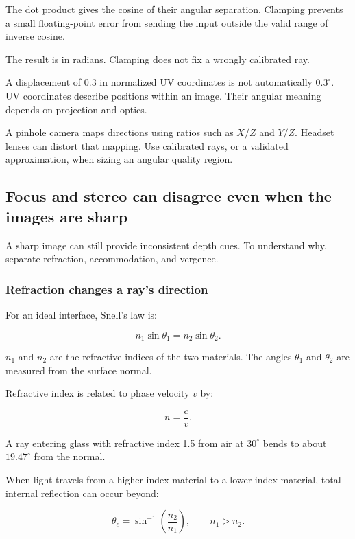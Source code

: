 The dot product gives the cosine of their angular separation. Clamping prevents a small floating-point error from sending the input outside the valid range of inverse cosine.

The result is in radians. Clamping does not fix a wrongly calibrated ray.

A displacement of 0.3 in normalized UV coordinates is not automatically \(0.3^\circ\). UV coordinates describe positions within an image. Their angular meaning depends on projection and optics.

A pinhole camera maps directions using ratios such as \(X/Z\) and \(Y/Z\). Headset lenses can distort that mapping. Use calibrated rays, or a validated approximation, when sizing an angular quality region.

\subsection{Focus and stereo can disagree even when the images are sharp}\label{04-visual-computing-ii-ch043-focus-and-stereo-can-disagree-even-when-the-images-are-sharp}

A sharp image can still provide inconsistent depth cues. To understand why, separate refraction, accommodation, and vergence.

\subsubsection{Refraction changes a ray's direction}\label{04-visual-computing-ii-ch043-refraction-changes-a-rays-direction}

For an ideal interface, Snell's law is:

\[
n_1\sin\theta_1=n_2\sin\theta_2.
\]

\(n_1\) and \(n_2\) are the refractive indices of the two materials. The angles \(\theta_1\) and \(\theta_2\) are measured from the surface normal.

Refractive index is related to phase velocity \(v\) by:

\[
n=\frac{c}{v}.
\]

A ray entering glass with refractive index 1.5 from air at \(30^\circ\) bends to about \(19.47^\circ\) from the normal.

When light travels from a higher-index material to a lower-index material, total internal reflection can occur beyond:

\[
\theta_c=\sin^{-1}\left(\frac{n_2}{n_1}\right),
\qquad n_1>n_2.
\]

